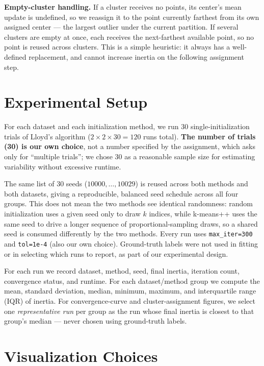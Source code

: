 \documentclass[a4paper,11pt]{article}
\begin{document}
\textbf{Empty-cluster handling.} If a cluster receives no points, its center's mean update is
undefined, so we reassign it to the point currently farthest from its own assigned center
--- the largest outlier under the current partition. If several clusters are empty at once,
each receives the next-farthest available point, so no point is reused across clusters. This
is a simple heuristic: it always has a well-defined replacement, and cannot increase inertia
on the following assignment step.

\section{Experimental Setup}
\label{sec:protocol}

For each dataset and each initialization method, we run 30 single-initialization trials of
Lloyd's algorithm ($2\times2\times30 = 120$ runs total). \textbf{The number of trials (30) is
our own choice}, not a number specified by the assignment, which asks only for ``multiple
trials''; we chose 30 as a reasonable sample size for estimating variability without excessive
runtime.

The same list of 30 seeds ($10000,\dots,10029$) is reused across both methods and both
datasets, giving a reproducible, balanced seed schedule across all four groups. This does not
mean the two methods see identical randomness: random initialization uses a given seed only
to draw $k$ indices, while k-means++ uses the same seed to drive a longer sequence of
proportional-sampling draws, so a shared seed is consumed differently by the two methods.
Every run uses \texttt{max\_iter=300} and \texttt{tol=1e-4} (also our own choice). Ground-truth
labels were not used in fitting or in selecting which runs to report, as part of our
experimental design.

For each run we record dataset, method, seed, final inertia, iteration count, convergence
status, and runtime. For each dataset/method group we compute the mean, standard
deviation, median, minimum, maximum, and interquartile range (IQR) of inertia. For
convergence-curve and cluster-assignment figures, we select one \emph{representative run}
per group as the run whose final inertia is closest to that group's median --- never chosen
using ground-truth labels.

\section{Visualization Choices}
\label{sec:vizchoices}
\end{document}
